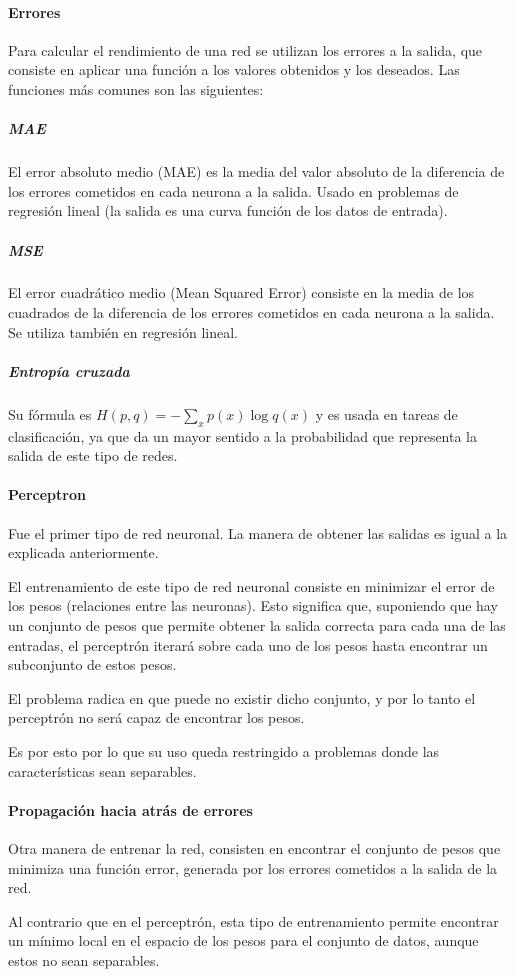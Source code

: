 \paragraph{Errores}
Para calcular el rendimiento de una red se utilizan los errores a la salida, que consiste en aplicar una función a los valores obtenidos y los deseados. Las funciones más comunes son las siguientes:

\subparagraph{MAE}
El error absoluto medio (MAE) es la media del valor absoluto de la diferencia de los errores cometidos en cada neurona a la salida. Usado en problemas de regresión lineal (la salida es una curva función de los datos de entrada).
\subparagraph{MSE}
El error cuadrático medio (Mean Squared Error) consiste en la media de los cuadrados de la diferencia de los errores cometidos en cada neurona a la salida. Se utiliza también en regresión lineal.
\subparagraph{Entropía cruzada}
Su fórmula es $H(p, q) = -\sum_{x}{p(x)\log q(x)}$ y es usada en tareas de clasificación, ya que da un mayor sentido a la probabilidad que representa la salida de este tipo de redes.

\paragraph{Perceptron}
Fue el primer tipo de red neuronal. La manera de obtener las salidas es igual a la explicada anteriormente.

El entrenamiento de este tipo de red neuronal consiste en minimizar el error de los pesos (relaciones entre las neuronas). Esto significa que, suponiendo que hay un conjunto de pesos que permite obtener la salida correcta para cada una de las entradas, el perceptrón iterará sobre cada uno de los pesos hasta encontrar un subconjunto de estos pesos.

El problema radica en que puede no existir dicho conjunto, y por lo tanto el perceptrón no será capaz de encontrar los pesos.

Es por esto por lo que su uso queda restringido a problemas donde las características sean separables.

\paragraph{Propagación hacia atrás de errores}
Otra manera de entrenar la red, consisten en encontrar el conjunto de pesos que minimiza una función error, generada por los errores cometidos a la salida de la red.

Al contrario que en el perceptrón, esta tipo de entrenamiento permite encontrar un mínimo local en el espacio de los pesos para el conjunto de datos, aunque estos no sean separables.

